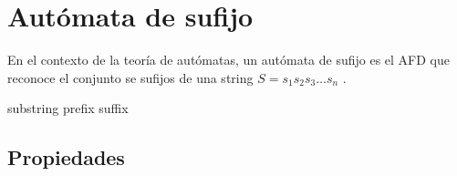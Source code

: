 \section{Autómata de sufijo}\label{SuffixAutomaton}
En el contexto de la teoría de autómatas, un autómata de sufijo es el \acrshort{AFD} que reconoce el conjunto se sufijos de una \gls{string} $S  = s_1 s_2 s_3 \dots s_n $ \cite{wiki:Suffix_automaton}.

\gls{substring}
\gls{prefix}
\gls{suffix}

\subsection{Propiedades}

